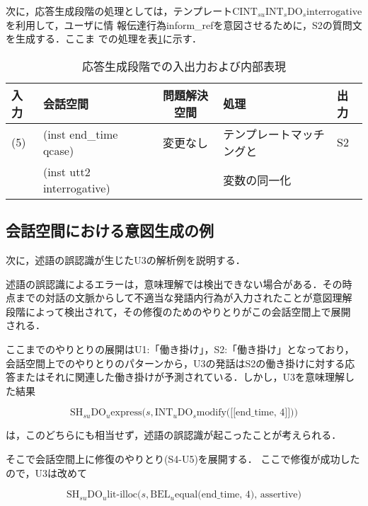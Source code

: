 次に，応答生成段階の処理としては，テンプレート$\mbox{CINT}_{su}
\mbox{INT}_s \mbox{DO}_s \mbox{interrogative}$を利用して，ユーザに情
報伝達行為inform\_refを意図させるために，S2の質問文を生成する．ここま
での処理を表\ref{ex-table5}に示す．

\begin{table}[htbp]
\centering
\caption{応答生成段階での入出力および内部表現}
\label{ex-table5}
\begin{tabular}{|l|l|c|l|l|}
\hline
入力 & 会話空間 & 問題解決空間 & 処理 & 出力 \\
\hline
\hline
(5) & (inst end\_time qcase)  & 変更なし & テンプレートマッチングと&  S2 \\
&  (inst utt2 interrogative)  & & 変数の同一化 & \\
\hline
\end{tabular}
\end{table}

\vspace{-4mm}
\subsection{会話空間における意図生成の例}
\label{ex-1}

次に，述語の誤認識が生じたU3の解析例を説明する．

述語の誤認識によるエラーは，意味理解では検出できない場合がある．その時
点までの対話の文脈からして不適当な発語内行為が入力されたことが意図理解
段階によって検出されて，その修復のためのやりとりがこの会話空間上で展開
される．

ここまでのやりとりの展開はU1:「働き掛け」，S2:「働き掛け」となっており，
会話空間上でのやりとりのパターンから，U3の発話はS2の働き掛けに対する応
答またはそれに関連した働き掛けが予測されている．しかし，U3を意味理解し
た結果

\begin{equation}
\mbox{SH}_{su} \mbox{DO}_u \mbox{express(}s, \mbox{INT}_u
\mbox{DO}_s \mbox{modify([[end\_time, 4]]))}
\end{equation}

は，このどちらにも相当せず，述語の誤認識が起こったことが考えられる．

そこで会話空間上に修復のやりとり(S4-U5)を展開する．
ここで修復が成功したので，U3は改めて

\begin{equation}
\mbox{SH}_{su} \mbox{DO}_u \mbox{lit-illoc(} s, \mbox{BEL}_u
\mbox{equal(end\_time, 4), assertive)}
\end{equation}

